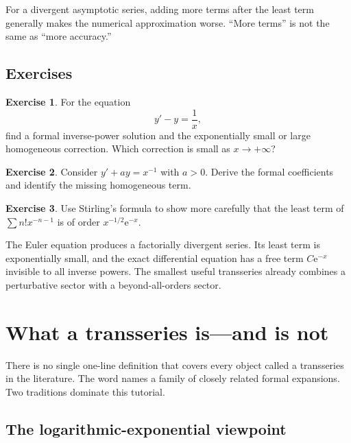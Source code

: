 \documentclass[11pt,openany]{book}
\theoremstyle{definition}
\newtheorem{exercise}{Exercise}[chapter]
\theoremstyle{plain}
\theoremstyle{remark}
\newcommand{\e}{\mathrm{e}}
\begin{document}
\begin{warningbox}
For a divergent asymptotic series, adding more terms after the least term generally makes the numerical approximation worse. ``More terms'' is not the same as ``more accuracy.''
\end{warningbox}

\section{Exercises}

\begin{exercise}
For the equation
\[
 y'-y=\frac1x,
\]
find a formal inverse-power solution and the exponentially small or large homogeneous correction. Which correction is small as $x\to+\infty$?
\end{exercise}

\begin{exercise}
Consider $y'+ay=x^{-1}$ with $a>0$. Derive the formal coefficients and identify the missing homogeneous term.
\end{exercise}

\begin{exercise}
Use Stirling's formula to show more carefully that the least term of
$\sum n!x^{-n-1}$ is of order $x^{-1/2}\e^{-x}$.
\end{exercise}

\begin{summarybox}
The Euler equation produces a factorially divergent series. Its least term is exponentially small, and the exact differential equation has a free term $C\e^{-x}$ invisible to all inverse powers. The smallest useful transseries already combines a perturbative sector with a beyond-all-orders sector.
\end{summarybox}


\chapter{What a transseries is---and is not}\label{ch:first-transseries}

There is no single one-line definition that covers every object called a transseries in the literature. The word names a family of closely related formal expansions. Two traditions dominate this tutorial.

\section{The logarithmic-exponential viewpoint}
\end{document}
